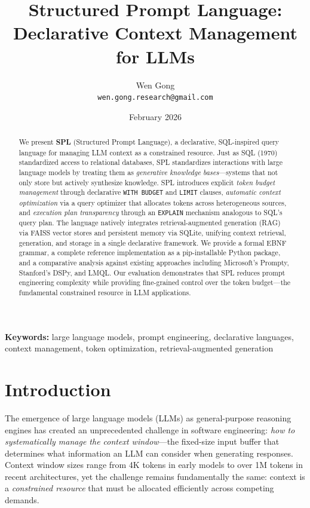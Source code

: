\documentclass[11pt,a4paper]{article}
\title{%
  \textbf{Structured Prompt Language:\\
  Declarative Context Management for LLMs}
}
\author{
  Wen Gong\\
  \small \texttt{wen.gong.research@gmail.com}
}
\date{February 2026}
\begin{document}
\maketitle

\begin{abstract}

We present \textbf{SPL} (Structured Prompt Language), a declarative, SQL-inspired query language for managing LLM context as a constrained resource. Just as SQL (1970) standardized access to relational databases, SPL standardizes interactions with large language models by treating them as \emph{generative knowledge bases}---systems that not only store but actively synthesize knowledge. SPL introduces explicit \emph{token budget management} through declarative \texttt{WITH BUDGET} and \texttt{LIMIT} clauses, \emph{automatic context optimization} via a query optimizer that allocates tokens across heterogeneous sources, and \emph{execution plan transparency} through an \texttt{EXPLAIN} mechanism analogous to SQL's query plan. The language natively integrates retrieval-augmented generation (RAG) via FAISS vector stores and persistent memory via SQLite, unifying context retrieval, generation, and storage in a single declarative framework. We provide a formal EBNF grammar, a complete reference implementation as a pip-installable Python package, and a comparative analysis against existing approaches including Microsoft's Prompty, Stanford's DSPy, and LMQL. Our evaluation demonstrates that SPL reduces prompt engineering complexity while providing fine-grained control over the token budget---the fundamental constrained resource in LLM applications.

\end{abstract}

\textbf{Keywords:} large language models, prompt engineering, declarative languages, context management, token optimization, retrieval-augmented generation

\section{Introduction}
\label{sec:intro}

The emergence of large language models (LLMs) as general-purpose reasoning engines has created an unprecedented challenge in software engineering: \emph{how to systematically manage the context window}---the fixed-size input buffer that determines what information an LLM can consider when generating responses. Context window sizes range from 4K tokens in early models to over 1M tokens in recent architectures, yet the challenge remains fundamentally the same: context is a \emph{constrained resource} that must be allocated efficiently across competing demands.
\end{document}
